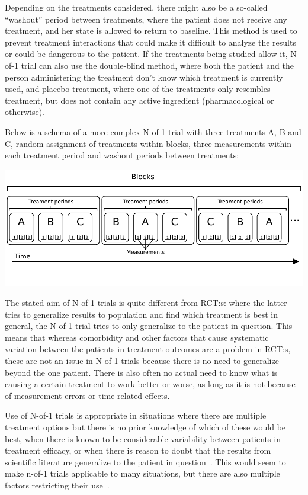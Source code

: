 \documentclass[12pt,a4paper,leqno]{report}
\theoremstyle{plain}
\theoremstyle{definition}
\theoremstyle{remark}
\begin{document}
Depending on the treatments considered, there might also be a so-called
``washout'' period between treatments, where the patient does not receive any
treatment, and her state is allowed to return to baseline. This method is used to
prevent treatment interactions that could make it difficult to analyze the
results or could be dangerous to the patient. If the treatments being studied
allow it, N-of-1 trial can also use the double-blind method, where both the patient
and the person administering the treatment don't know which treatment is currently used, and placebo
treatment, where one of the treatments only resembles treatment, but does not
contain any active ingredient (pharmacological or otherwise).

Below is a schema of a more complex N-of-1 trial with three treatments A, B and C,
random assignment of treatments within blocks, three measurements within each
treatment period and washout periods between treatments:

\bigskip
{
    \centering
    \includegraphics{n-of-1_schema.pdf}
    \par
}
\bigskip

The stated aim of N-of-1 trials is quite different from RCT:s: where the latter
tries to generalize results to population and find which treatment is best in
general, the N-of-1 trial tries to only generalize to the patient in question.
This means that whereas comorbidity and other factors that cause systematic
variation between the patients in treatment outcomes are a problem in RCT:s,
these are not an issue in N-of-1 trials because there is no need to generalize
beyond the one patient. There is also often no actual need to know what is
causing a certain treatment to work better or worse, as long as it is not
because of measurement errors or time-related effects.

Use of N-of-1 trials is appropriate in situations where there are multiple
treatment options but there is no prior knowledge of which of these would be
best, when there is known to be considerable variability between patients in
treatment efficacy, or when there is reason to doubt that the results from
scientific literature generalize to the patient in question\ \cite{nofone}. This
would seem to make n-of-1 trials applicable to many situations, but there are
also multiple factors restricting their use\ \cite{nofone}.
\end{document}
